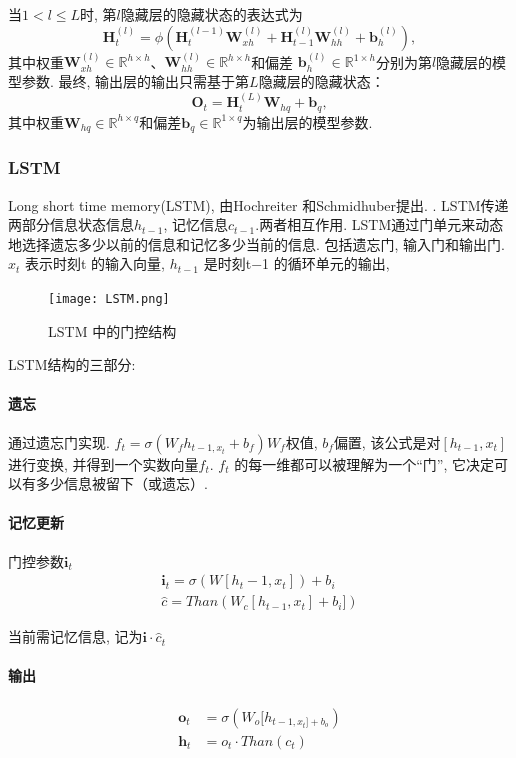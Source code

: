 当$1 < l \leq L$时, 第$l$隐藏层的隐藏状态的表达式为
$$\mathbf{H}_t^{(l)} = \phi(\mathbf{H}_t^{(l-1)} \mathbf{W}_{xh}^{(l)} + \mathbf{H}_{t-1}^{(l)} \mathbf{W}_{hh}^{(l)}  + \mathbf{b}_h^{(l)}), $$
其中权重$\mathbf{W}_{xh}^{(l)} \in \mathbb{R}^{h \times h}$、$\mathbf{W}_{hh}^{(l)} \in \mathbb{R}^{h \times h}$和偏差 $\mathbf{b}_h^{(l)} \in \mathbb{R}^{1 \times h}$分别为第$l$隐藏层的模型参数. 
最终, 输出层的输出只需基于第$L$隐藏层的隐藏状态：
$$\mathbf{O}_t = \mathbf{H}_t^{(L)} \mathbf{W}_{hq} + \mathbf{b}_q, $$
其中权重$\mathbf{W}_{hq} \in \mathbb{R}^{h \times q}$和偏差$\mathbf{b}_q \in \mathbb{R}^{1 \times q}$为输出层的模型参数. 

\subsubsection{LSTM}
Long short time memory(LSTM),  由Hochreiter 和Schmidhuber提出. \citep{HochreiterLong}. 
LSTM传递两部分信息状态信息$h_{t-1}$, 记忆信息$c_{t-1}$.两者相互作用. LSTM通过门单元来动态地选择遗忘多少以前的信息和记忆多少当前的信息. 包括遗忘门, 输入门和输出门. 
$x_t$ 表示时刻t 的输入向量, $h_{t−1}$ 是时刻t−1 的循环单元的输出, 
\begin{figure}[!htb]
    \center
\texttt{[image: LSTM.png]}
\caption{LSTM 中的门控结构}
\end{figure}
LSTM结构的三部分:
\paragraph{遗忘} 通过遗忘门实现.
$f_t=\sigma (W_f h_{t-1, x_t}+b_f)$$ W_f $权值, $b_f$偏置, 该公式是对$[h_{t−1}, x_t]$ 进行变换, 并得到一个实数向量$f_t$. $f_t$ 的每一维都可以被理解为一个“门”, 它决定可以有多少信息被留下（或遗忘）. 

\paragraph{记忆更新}
门控参数$\mathbf{i}_t$
\begin{align*}
    \mathbf{i}_t=\sigma(W[h_t-1, x_t])+b_i \\
    \hat{c}=Than(W_c[h_{t-1}, x_t]+b_i])
    \end{align*}

当前需记忆信息, 记为$\mathbf{i} \cdot \hat{c}_t$

\paragraph{输出}
\begin{align*}
\mathbf{o}_t  & =\sigma(W_o[h_{t-1, x_t]+b_o}) \\
\mathbf{h}_t & ={o}_t \cdot Than(c_t)
\end{align*}
 

